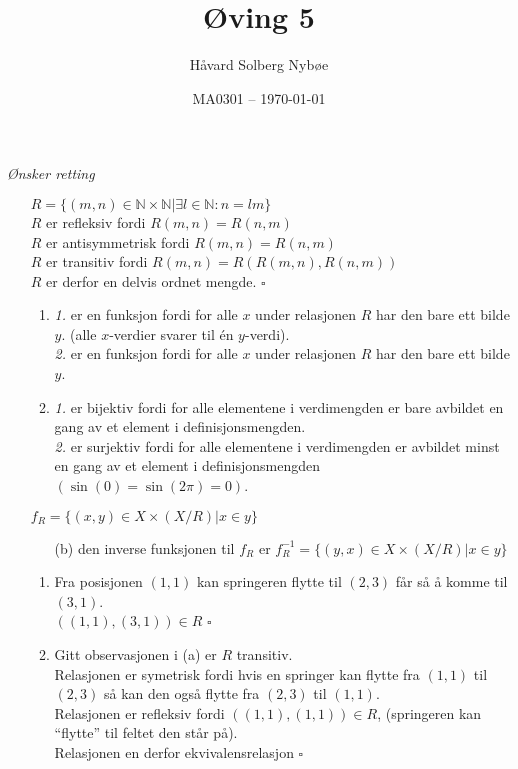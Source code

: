 \documentclass[a4paper, 12pt]{article}  %
\title{Øving 5}                         %
\author{Håvard Solberg Nybøe}           %
\date{MA0301 -- \today}                 %
\begin{document}
\maketitle

\textit{Ønsker retting}

\begin{enumerate}
    \item [\boxed{1}] \(R = \{(m,n) \in \mathbb{N}\times\mathbb{N}|\exists l \in \mathbb{N}:n=lm\}\)
    \\[1em]\(R\) er refleksiv fordi \(R(m,n)=R(n,m)\)
    \\\(R\) er antisymmetrisk fordi \(R(m,n)=R(n,m)\)
    \\\(R\) er transitiv fordi \(R(m,n)=R(R(m,n),R(n,m))\) 
    \\[1em]\(R\) er derfor en delvis ordnet mengde. \(\square\)

    \item [\boxed{2}] 
    \begin{enumerate}
        \item \textit{1.} er en funksjon fordi for alle \(x\) under relasjonen \(R\) har den bare ett bilde \(y\). (alle \(x\)-verdier svarer til én \(y\)-verdi).
        \\\textit{2.} er en funksjon fordi for alle \(x\) under relasjonen \(R\) har den bare ett bilde \(y\).
        \item \textit{1.} er bijektiv fordi for alle elementene i verdimengden er bare avbildet en gang av et element i definisjonsmengden.
        \\\textit{2.} er surjektiv fordi for alle elementene i verdimengden er avbildet minst en gang av et element i definisjonsmengden \((\sin(0) = \sin(2\pi) = 0)\).
    \end{enumerate}
    
    \item [\boxed{3}] \(f_R = \{(x,y) \in X \times (X/R)|x \in y\}\)
    \begin{enumerate}
        \item [(b)] den inverse funksjonen til \(f_R\) er \(f_R^{-1} = \{(y,x) \in X \times (X/R)|x \in y\}\)
    \end{enumerate}
    
    \item [\boxed{4}]
    \begin{enumerate}
        \item Fra posisjonen \((1, 1)\) kan springeren flytte til \((2, 3)\) får så å komme til \((3, 1)\).
        \\\(((1,1),(3,1)) \in R\) \(\square\)
        \item Gitt observasjonen i (a) er \(R\) transitiv. 
        \\Relasjonen er symetrisk fordi hvis en springer kan flytte fra \((1,1)\) til \((2,3)\) så kan den også flytte fra \((2,3)\) til \((1,1)\).
        \\Relasjonen er refleksiv fordi \(((1,1),(1,1)) \in R\), (springeren kan ``flytte'' til feltet den står på).
        \\Relasjonen en derfor ekvivalensrelasjon \(\square\)
    \end{enumerate}
    

\end{enumerate}
\end{document}
